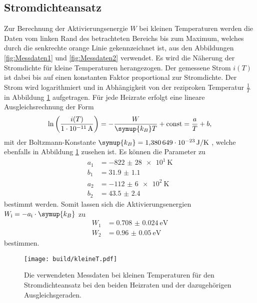 \subsection{Stromdichteansatz}
\label{sec:klT}
Zur Berechnung der Aktivierungsenergie $W$ bei kleinen Temperaturen werden die Daten vom linken Rand des betrachteten Bereichs bis zum Maximum, welches durch die senkrechte orange Linie gekennzeichnet ist,
aus den Abbildungen \ref{fig:Messdaten1} und \ref{fig:Messdaten2} verwendet. Es wird die Näherung der Stromdichte für kleine Temperaturen
herangezogen. Der gemessene Strom $i(T)$ ist dabei bis auf einen konstanten Faktor proportional zur Stromdichte. Der Strom wird logarithmiert
und in Abhängigkeit von der reziproken Temperatur $\frac{1}{T}$ in Abbildung \ref{fig:klT} aufgetragen. Für jede Heizrate erfolgt eine lineare Ausgleichsrechnung der Form
\begin{equation}
    \label{eqn:lin}
    \ln\left(\frac{i(T)}{\SI{1e-11}{\ampere}}\right) = -\frac{W}{\symup{k_B} T} + \text{const} = \frac{a}{T} + b,
\end{equation}
mit der Boltzmann-Konstante $\symup{k_B} = \SI{1.380649e-23}{\joule\per\kelvin}$ \cite{codata}, welche ebenfalls in Abbildung \ref{fig:klT} zusehen ist.
Es können die Parameter zu
\begin{align*}
    a_1 &= \SI{-822(28)e1}{\kelvin} \\
    b_1 &= \num{31.9(11)} \\
    a_2 &= \SI{-112(6)e2}{\kelvin} \\
    b_2 &= \num{43.5(24)}
\end{align*}
bestimmt werden.
Somit lassen sich die Aktivierungsenergien $W_\text{i} = -a_\text{i} \cdot \symup{k_B}$ zu
\begin{align*}
    W_1 &= \SI{0.708(24)}{\electronvolt} \\
    W_2 &= \SI{0.96(5)}{\electronvolt}
\end{align*}
bestimmen.
\begin{figure}[htb]
  \centering
  \texttt{[image: build/kleineT.pdf]}
  \caption{Die verwendeten Messdaten bei kleinen Temperaturen für den Stromdichteansatz bei den beiden Heizraten und der dazugehörigen Ausgleichsgeraden.}
  \label{fig:klT}
\end{figure}
\FloatBarrier

